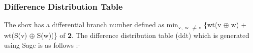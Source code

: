 \documentclass[journal=tosc,preprint]{iacrtrans}
\begin{document}
\subsubsection{Difference Distribution Table}
The sbox has a differential branch number defined as min\textsubscript{v, w $\neq$v} \{wt(v $\oplus$ w) + wt(S(v) $\oplus$ S(w))\} of \textbf{2}. The difference distribution table (ddt) which is generated using Sage is as follows :- 
\begin{table}[h]
	\centering
\end{table}
\end{document}
